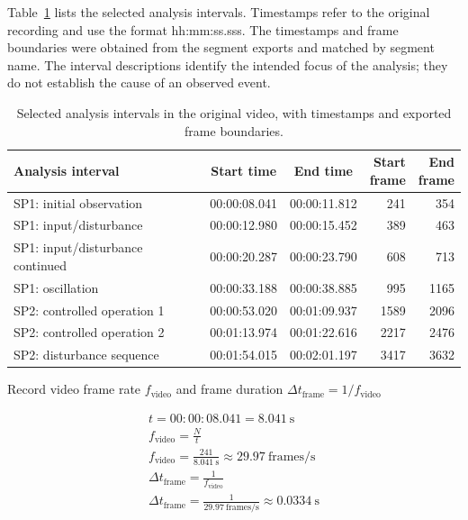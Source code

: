 \documentclass[11pt,a4paper]{article}
\begin{document}
Table~\ref{tab:intervals} lists the selected analysis intervals.
Timestamps refer to the original recording and use the format
hh:mm:ss.sss. The timestamps and frame boundaries were obtained
from the segment exports and matched by segment name.
The interval descriptions identify the intended focus of the
analysis; they do not establish the cause of an observed event.


\begin{table}[H]
    \centering
    \small
    \caption{Selected analysis intervals in the original video,
    with timestamps and exported frame boundaries.}
    
    \label{tab:intervals}
    \begin{tabular}{@{}lccrr@{}}
        \toprule
        Analysis interval
        & Start time
        & End time
        & \shortstack{Start\\frame}
        & \shortstack{End\\frame} \\
        \midrule
        SP1: initial observation
        & 00:00:08.041 & 00:00:11.812 & 241 & 354 \\

        SP1: input/disturbance
        & 00:00:12.980 & 00:00:15.452 & 389 & 463 \\

        SP1: input/disturbance continued
        & 00:00:20.287 & 00:00:23.790 & 608 & 713 \\

        SP1: oscillation
        & 00:00:33.188 & 00:00:38.885 & 995 & 1165 \\

        SP2: controlled operation 1
        & 00:00:53.020 & 00:01:09.937 & 1589 & 2096 \\

        SP2: controlled operation 2
        & 00:01:13.974 & 00:01:22.616 & 2217 & 2476 \\

        SP2: disturbance sequence
        & 00:01:54.015 & 00:02:01.197 & 3417 & 3632 \\
        \bottomrule
    \end{tabular}
\end{table}

Record video frame rate $f_\text{video}$ and frame duration $\Delta t_\text{frame} = 1/f_\text{video}$\newline

\begin{gather}
t = 00{:}00{:}08.041 = 8.041~\text{s} \nonumber \\
f_\text{video} = \frac{N}{t} \label{eq:fvideo} \\
f_\text{video} = \frac{241}{8.041~\text{s}} \approx 29.97~\text{frames/s} \nonumber \\
\Delta t_\text{frame} = \frac{1}{f_\text{video}} \label{eq:dtframe} \\
\Delta t_\text{frame} = \frac{1}{29.97~\text{frames/s}} \approx 0.0334~\text{s} \nonumber
\end{gather}
\end{document}
